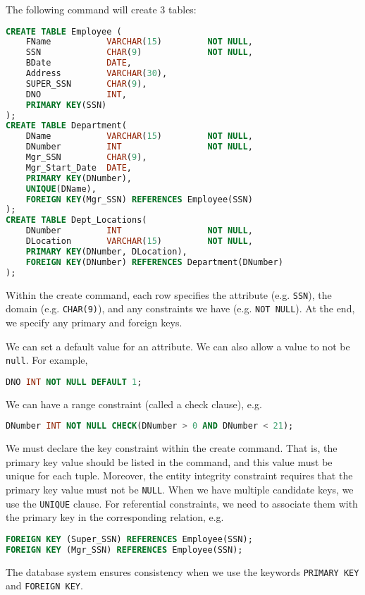 \documentclass[a4paper, openany]{memoir}
\begin{document}
The following command will create 3 tables:
\begin{lstlisting}[language=SQL]
CREATE TABLE Employee (
    FName           VARCHAR(15)         NOT NULL,
    SSN             CHAR(9)             NOT NULL,
    BDate           DATE,
    Address         VARCHAR(30),
    SUPER_SSN       CHAR(9),
    DNO             INT,
    PRIMARY KEY(SSN)
);
CREATE TABLE Department(
    DName           VARCHAR(15)         NOT NULL,
    DNumber         INT                 NOT NULL,
    Mgr_SSN         CHAR(9),
    Mgr_Start_Date  DATE,
    PRIMARY KEY(DNumber),
    UNIQUE(DName),
    FOREIGN KEY(Mgr_SSN) REFERENCES Employee(SSN)
);
CREATE TABLE Dept_Locations(
    DNumber         INT                 NOT NULL,
    DLocation       VARCHAR(15)         NOT NULL,
    PRIMARY KEY(DNumber, DLocation),
    FOREIGN KEY(DNumber) REFERENCES Department(DNumber)
);
\end{lstlisting}
Within the create command, each row specifies the attribute (e.g. \texttt{SSN}), the domain (e.g. \texttt{CHAR(9)}), and any constraints we have (e.g. \texttt{NOT NULL}). At the end, we specify any primary and foreign keys.

We can set a default value for an attribute. We can also allow a value to not be \texttt{null}. For example, 
\begin{lstlisting}[language=SQL]
DNO INT NOT NULL DEFAULT 1;
\end{lstlisting}
We can have a range constraint (called a check clause), e.g.
\begin{lstlisting}[language=SQL]
DNumber INT NOT NULL CHECK(DNumber > 0 AND DNumber < 21);
\end{lstlisting}

We must declare the key constraint within the create command. That is, the primary key value should be listed in the command, and this value must be unique for each tuple. Moreover, the entity integrity constraint requires that the primary key value must not be \texttt{NULL}. When we have multiple candidate keys, we use the \texttt{UNIQUE} clause. For referential constraints, we need to associate them with the primary key in the corresponding relation, e.g.
\begin{lstlisting}[language=SQL]
FOREIGN KEY (Super_SSN) REFERENCES Employee(SSN);
FOREIGN KEY (Mgr_SSN) REFERENCES Employee(SSN);
\end{lstlisting}
The database system ensures consistency when we use the keywords \texttt{PRIMARY KEY} and \texttt{FOREIGN KEY}.
\end{document}
